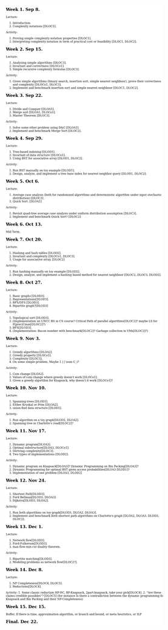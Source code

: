 \documentclass[aspectratio=169]{beamer}
\begin{document}
\begin{frame}
\begin{columns}
    \includegraphics[width=\linewidth, trim=0in 35in 0in 0in, clip]{structure_figs/AgendaMap.png}
    
  \end{columns}
\end{frame}
\end{document}
